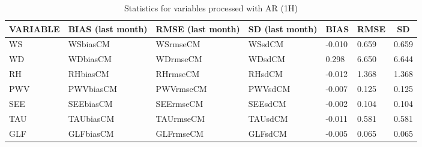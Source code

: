\documentclass[11pt,english]{article}
\begin{document}
\begin{table}[]
\begin{center}
\begin{tabular}{|l|l|l|l|l|l|l|}
\hline
\multicolumn{1}{|c|}{\cellcolor[HTML]{C0C0C0}\textbf{VARIABLE}} & \multicolumn{1}{c|}{\cellcolor[HTML]{C0C0C0}\textbf{BIAS} (last month)} & \multicolumn{1}{c|}{\cellcolor[HTML]{C0C0C0}\textbf{RMSE} (last month)} & \multicolumn{1}{c|}{\cellcolor[HTML]{C0C0C0}\textbf{SD} (last month)} & \multicolumn{1}{c|}{\cellcolor[HTML]{C0C0C0}\textbf{BIAS}} & \multicolumn{1}{c|}{\cellcolor[HTML]{C0C0C0}\textbf{RMSE}} & \multicolumn{1}{c|}{\cellcolor[HTML]{C0C0C0}\textbf{SD}}\\\hline
\cellcolor[HTML]{C0C0C0}WS  & WSbiasCM     & WSrmseCM     & WSsdCM  &    -0.010  &     0.659  &     0.659 \\
\cellcolor[HTML]{C0C0C0}WD  & WDbiasCM     & WDrmseCM     & WDsdCM  &     0.298  &     6.650  &     6.644 \\
\cellcolor[HTML]{C0C0C0}RH  & RHbiasCM     & RHrmseCM     & RHsdCM  &    -0.012  &     1.368  &     1.368 \\
\cellcolor[HTML]{C0C0C0}PWV & PWVbiasCM    & PWVrmseCM    & PWVsdCM &    -0.007 &     0.125 &     0.125 \\
\cellcolor[HTML]{C0C0C0}SEE & SEEbiasCM    & SEErmseCM    & SEEsdCM &    -0.002 &     0.104 &     0.104 \\
\cellcolor[HTML]{C0C0C0}TAU & TAUbiasCM    & TAUrmseCM    & TAUsdCM &    -0.011 &     0.581 &     0.581 \\
\cellcolor[HTML]{C0C0C0}GLF & GLFbiasCM    & GLFrmseCM    & GLFsdCM &    -0.005 &     0.065 &     0.065 \\
\hline
\end{tabular}
\caption{Statistics for variables processed with AR (1H)}
\end{center}
\end{table}

\newpage
\end{document}
